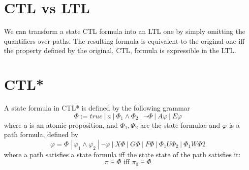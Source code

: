 \documentclass{article}[18pt]
\begin{document}
\section{CTL vs LTL}
We can transform a state CTL formula into an LTL one by simply omitting the quantifiers over paths. The resulting formula is equivalent to the original one iff the property defined by the original, CTL, formula is expressible in the LTL.
\section{CTL*}
\begin{definition}
A state formula in CTL* is defined by the following grammar
$$\Phi:=true \ | \ a \ | \ \Phi_1\land\Phi_2 \ | \ \lnot \Phi \ | \  A\varphi \ | \ E\varphi $$
where a is an atomic proposition, and $\Phi_1,\Phi_2$ are the state formulae and $\varphi$ is a path formula, defined by
$$\varphi=\Phi  \ | \ \varphi_1\land\varphi_2 \ | \ \lnot \varphi \ | \ X\Phi \ | \ G\Phi \ | \ F\Phi \ | \ \Phi_1 U \Phi_2 \ | \ \Phi_1 W \Phi 2$$
where a path satisfies a state formula iff the state state of the path satisfies it:
$$\pi\models \Phi \text{ iff } \pi_0\models\Phi$$
\end{definition}
\end{document}
